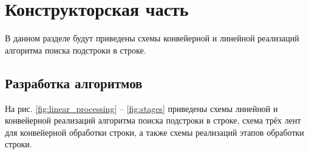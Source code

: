 \chapter{Конструкторская часть}

В данном разделе будут приведены схемы конвейерной и линейной реализаций алгоритма поиска подстроки в строке.

\section{Разработка алгоритмов}

На рис. \ref{fig:linear_processing} -- \ref{fig:stages} приведены схемы линейной и конвейерной реализаций алгоритма поиска подстроки в строке, схема трёх лент для конвейерной обработки строки, а также схемы реализаций этапов обработки строки.


